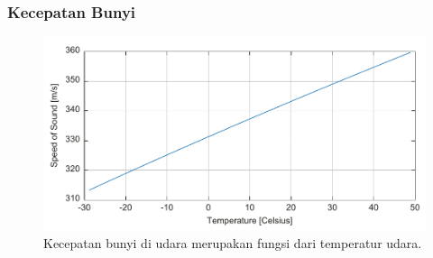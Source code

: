 \documentclass[pdflatex,compress]{beamer}
\begin{document}
\begin{frame}
	\frametitle{Kecepatan Bunyi}
	\begin{figure}
		\centering
		\includegraphics[width=\linewidth]{img/img010}
		\caption{Kecepatan bunyi di udara merupakan fungsi dari temperatur udara.}
		\label{fig:img010}
	\end{figure}
\end{frame}
\end{document}
